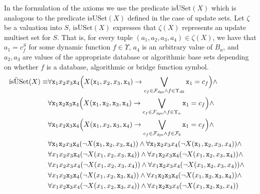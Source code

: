 \documentclass[preprint,11pt]{elsarticle}
\theoremstyle{definition}
\theoremstyle{remark}
\begin{document}
In the formulation of the axioms we use the predicate $\mathrm{is\ddot{U}Set}(X)$ which is analogous to the predicate $\mathrm{isUSet}(X)$ defined in the case of update sets. Let $\zeta$ be a valuation into $S$, $\mathrm{is\ddot{U}Set}(X)$ expresses that $\zeta(X)$ represents an update multiset set for $S$.  That is, for every tuple $(a_1, a_2, a_3, a_4) \in \zeta(X)$, we have that $a_1 = c^S_f$ for some dynamic function $f \in \Upsilon$, $a_4$ is an arbitrary value of $B_a$, and $a_2, a_3$ are values of the appropriate database or algorithmic base sets depending on whether $f$ is a database, algorithmic or bridge function symbol.
\begin{align*}
\mathrm{is\ddot{U}Set}(X) \equiv& \forall \mathtt{x}_1 x_2 x_3 \mathtt{x}_4 \Big(X(\mathtt{x}_1, x_2, x_3, \mathtt{x}_4) \rightarrow \bigvee_{c_f \in {\cal F}_\mathit{dyn} \wedge f \in \Upsilon_{db}} \mathtt{x}_1 = c_f\Big) \wedge&\\
&\forall \mathtt{x}_1 \mathtt{x}_2 \mathtt{x}_3 \mathtt{x}_4 \Big(X(\mathtt{x}_1, \mathtt{x}_2, \mathtt{x}_3, \mathtt{x}_4) \rightarrow \bigvee_{c_f \in {\cal F}_\mathit{dyn} \wedge f \in \Upsilon_{a}} \mathtt{x}_1 = c_f\Big) \wedge&\\
&\forall \mathtt{x}_1 x_2 \mathtt{x}_3 \mathtt{x}_4 \Big(X(\mathtt{x}_1, x_2, \mathtt{x}_3, \mathtt{x}_4) \rightarrow \bigvee_{c_f \in {\cal F}_\mathit{dyn} \wedge f \in {\cal F}_{b}} \mathtt{x}_1 = c_f\Big) \wedge&\\
&\forall \mathtt{x}_1 \mathtt{x}_2 x_3 \mathtt{x}_4(\neg X(\mathtt{x}_1, \mathtt{x}_2, x_3, \mathtt{x}_4)) \wedge \forall \mathtt{x}_1 \mathtt{x}_2 x_3 x_4(\neg X(\mathtt{x}_1, \mathtt{x}_2, x_3, x_4)) \wedge&\\
&\forall x_1 x_2 x_3 \mathtt{x}_4 ( \neg X(x_1, x_2, x_3, \mathtt{x}_4)) \wedge \forall x_1 \mathtt{x}_2 x_3 \mathtt{x}_4( \neg X(x_1, \mathtt{x}_2, x_3, \mathtt{x}_4)) \wedge&\\
&\forall x_1 x_2 x_3 x_4 ( \neg X(x_1, x_2, x_3, x_4)) \wedge \forall x_1 \mathtt{x}_2 x_3 x_4( \neg X(x_1, \mathtt{x}_2, x_3, x_4)) \wedge&\\
&\forall x_1 x_2 \mathtt{x}_3 \mathtt{x}_4 ( \neg X(x_1, x_2, \mathtt{x}_3, \mathtt{x}_4)) \wedge \forall x_1 \mathtt{x}_2 \mathtt{x}_3 \mathtt{x}_4 ( \neg X(x_1, \mathtt{x}_2, \mathtt{x}_3, \mathtt{x}_4))\wedge&\\
&\forall x_1 x_2 \mathtt{x}_3 x_4 ( \neg X(x_1, x_2, \mathtt{x}_3, x_4)) \wedge \forall x_1 \mathtt{x}_2 \mathtt{x}_3 x_4 ( \neg X(x_1, \mathtt{x}_2, \mathtt{x}_3, x_4))&
\end{align*}
\end{document}
